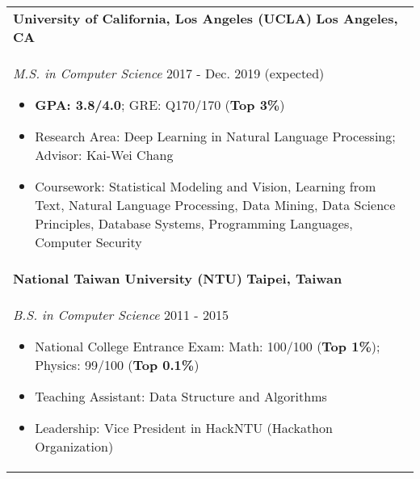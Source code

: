 \documentclass[letterpaper,11pt]{article} %
\begin{document}
{%
\begin{tabular}{p{18.5cm}}
{\bf{University of California, Los Angeles (UCLA)}}  \hfill \bf{Los Angeles, CA}\\
{\it M.S. in Computer Science} \hfill  2017 - Dec. 2019 (expected)
\begin{itemize}
\item \textbf{GPA: 3.8/4.0}; GRE: Q170/170 (\textbf{Top 3\%})
\item Research Area: Deep Learning in Natural Language Processing; Advisor: Kai-Wei Chang 
\item Coursework: Statistical Modeling and Vision, Learning from Text, Natural Language Processing, Data Mining, Data Science Principles, Database Systems, Programming Languages, Computer Security 
\vspace*{-\baselineskip}%
\end{itemize}\\ 
\vspace{.1mm}
%
{\bf{National Taiwan University (NTU)}} \hfill \bf{Taipei, Taiwan}\\
{\it B.S. in Computer Science} \hfill 2011 - 2015
\begin{itemize}
\item National College Entrance Exam:  Math: 100/100 (\textbf{Top 1\%}); Physics: 99/100 (\textbf{Top 0.1\%}) 
\item Teaching Assistant: Data Structure and Algorithms
\item Leadership: Vice President in HackNTU (Hackathon Organization)
\vspace*{-\baselineskip}
\end{itemize} 
\end{tabular}

}
\end{document}
